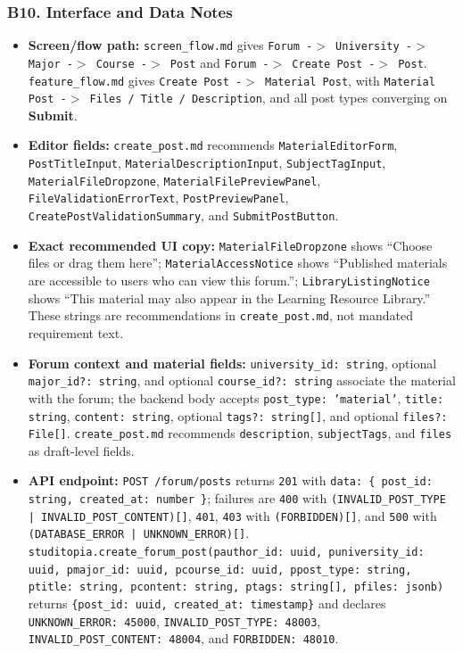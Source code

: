 \documentclass[12pt]{article}
\begin{document}
\hypertarget{sec:b10-interface-and-data-notes}{}
\subsubsection*{B10. Interface and Data Notes}
\par\medskip

\begin{itemize}
\item \textbf{Screen/flow path:} \texttt{screen\_flow.md} gives \texttt{Forum -$>$ University -$>$ Major -$>$ Course -$>$ Post} and \texttt{Forum -$>$ Create Post -$>$ Post}. \texttt{feature\_flow.md} gives \texttt{Create Post -$>$ Material Post}, with \texttt{Material Post -$>$ Files / Title / Description}, and all post types converging on \textbf{Submit}.
\item \textbf{Editor fields:} \texttt{create\_post.md} recommends \texttt{MaterialEditorForm}, \texttt{PostTitleInput}, \texttt{MaterialDescriptionInput}, \texttt{SubjectTagInput}, \texttt{MaterialFileDropzone}, \texttt{MaterialFilePreviewPanel}, \texttt{FileValidationErrorText}, \texttt{PostPreviewPanel}, \texttt{CreatePostValidationSummary}, and \texttt{SubmitPostButton}.
\item \textbf{Exact recommended UI copy:} \texttt{MaterialFileDropzone} shows “Choose files or drag them here”; \texttt{MaterialAccessNotice} shows “Published materials are accessible to users who can view this forum.”; \texttt{LibraryListingNotice} shows “This material may also appear in the Learning Resource Library.” These strings are recommendations in \texttt{create\_post.md}, not mandated requirement text.
\item \textbf{Forum context and material fields:} \texttt{university\_id: string}, optional \texttt{major\_id?: string}, and optional \texttt{course\_id?: string} associate the material with the forum; the backend body accepts \texttt{post\_type: 'material'}, \texttt{title: string}, \texttt{content: string}, optional \texttt{tags?: string[]}, and optional \texttt{files?: File[]}. \texttt{create\_post.md} recommends \texttt{description}, \texttt{subjectTags}, and \texttt{files} as draft-level fields.
\item \textbf{API endpoint:} \texttt{POST /forum/posts} returns \texttt{201} with \texttt{data: \{ post\_id: string, created\_at: number \}}; failures are \texttt{400} with \texttt{(INVALID\_POST\_TYPE | INVALID\_POST\_CONTENT)[]}, \texttt{401}, \texttt{403} with \texttt{(FORBIDDEN)[]}, and \texttt{500} with \texttt{(DATABASE\_ERROR | UNKNOWN\_ERROR)[]}. \texttt{studitopia.create\_forum\_post(pauthor\_id: uuid, puniversity\_id: uuid, pmajor\_id: uuid, pcourse\_id: uuid, ppost\_type: string, ptitle: string, pcontent: string, ptags: string[], pfiles: jsonb)} returns \texttt{\{post\_id: uuid, created\_at: timestamp\}} and declares \texttt{UNKNOWN\_ERROR: 45000}, \texttt{INVALID\_POST\_TYPE: 48003}, \texttt{INVALID\_POST\_CONTENT: 48004}, and \texttt{FORBIDDEN: 48010}.

\end{itemize}
\end{document}
